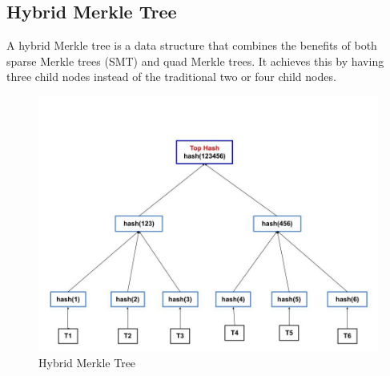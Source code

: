 \subsection{Hybrid Merkle Tree}
A hybrid Merkle tree is a data structure that combines the benefits of both sparse Merkle trees (SMT) and quad Merkle trees. It achieves this by having three child nodes instead of the traditional two or four child nodes.

\begin{figure}[H]
    \centering
    \includegraphics[scale=0.6]{figures/Hybrid Merkle Tree.jpg}
    \caption{Hybrid Merkle Tree}
 
\end{figure}